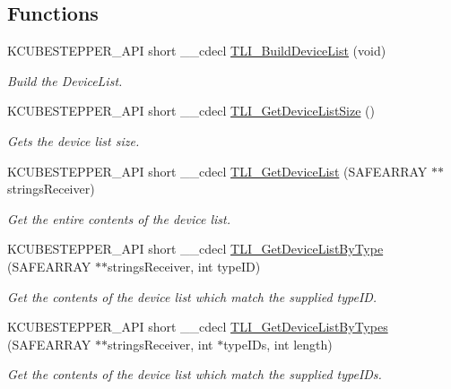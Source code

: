 \subsection*{Functions}
\begin{DoxyCompactItemize}
\item 
K\+C\+U\+B\+E\+S\+T\+E\+P\+P\+E\+R\+\_\+\+A\+PI short \+\_\+\+\_\+cdecl \hyperlink{group___k_cube_stepper_ga552313d19dade16cdcc6ea2a9f50eb12}{T\+L\+I\+\_\+\+Build\+Device\+List} (void)
\begin{DoxyCompactList}\small\item\em Build the Device\+List. \end{DoxyCompactList}\item 
K\+C\+U\+B\+E\+S\+T\+E\+P\+P\+E\+R\+\_\+\+A\+PI short \+\_\+\+\_\+cdecl \hyperlink{group___k_cube_stepper_ga2f17fbf521771370dfd865c442c93058}{T\+L\+I\+\_\+\+Get\+Device\+List\+Size} ()
\begin{DoxyCompactList}\small\item\em Gets the device list size. \end{DoxyCompactList}\item 
K\+C\+U\+B\+E\+S\+T\+E\+P\+P\+E\+R\+\_\+\+A\+PI short \+\_\+\+\_\+cdecl \hyperlink{group___k_cube_stepper_gaab5a07cd328136dc2d5ed578a54f50e1}{T\+L\+I\+\_\+\+Get\+Device\+List} (S\+A\+F\+E\+A\+R\+R\+AY $\ast$$\ast$strings\+Receiver)
\begin{DoxyCompactList}\small\item\em Get the entire contents of the device list. \end{DoxyCompactList}\item 
K\+C\+U\+B\+E\+S\+T\+E\+P\+P\+E\+R\+\_\+\+A\+PI short \+\_\+\+\_\+cdecl \hyperlink{group___k_cube_stepper_ga6f6a55f176d519279ebd4c13017576c8}{T\+L\+I\+\_\+\+Get\+Device\+List\+By\+Type} (S\+A\+F\+E\+A\+R\+R\+AY $\ast$$\ast$strings\+Receiver, int type\+ID)
\begin{DoxyCompactList}\small\item\em Get the contents of the device list which match the supplied type\+ID. \end{DoxyCompactList}\item 
K\+C\+U\+B\+E\+S\+T\+E\+P\+P\+E\+R\+\_\+\+A\+PI short \+\_\+\+\_\+cdecl \hyperlink{group___k_cube_stepper_gaf49933caeddb4df932869ebbb1aa7f41}{T\+L\+I\+\_\+\+Get\+Device\+List\+By\+Types} (S\+A\+F\+E\+A\+R\+R\+AY $\ast$$\ast$strings\+Receiver, int $\ast$type\+I\+Ds, int length)
\begin{DoxyCompactList}\small\item\em Get the contents of the device list which match the supplied type\+I\+Ds. \end{DoxyCompactList}\item 
$$
\end{DoxyCompactItemize}
